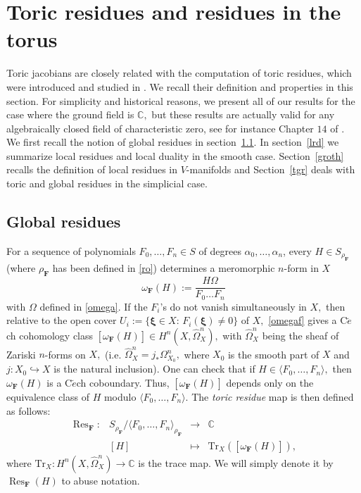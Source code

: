 \documentclass[a4paper,11pt]{amsart}
\newcommand{\Res}{\operatorname{Res}}
\newcommand{\C}{\mathbb{C}}
\newcommand{\bfF}{{\boldsymbol{F}}}
\newcommand{\bfxi}{{\boldsymbol{\xi}}}
\numberwithin{thm}{section}
\numberwithin{equation}{section}
\theoremstyle{definition}
\theoremstyle{plain}
\begin{document}
\bigskip
\section{Toric residues and residues in the torus}\label{sec:3}
Toric jacobians  are closely related with the computation of toric residues, which were introduced and studied in \cite{cox96, CCD97}.  We recall their definition and properties in this section. For simplicity and historical reasons, we present all of our results for the case where the ground field is $\C,$ but these results are actually valid for any algebraically closed field of characteristic zero, see for instance Chapter $14$ of \cite{kun08}. 
We first recall the notion of global residues in section~\ref{ssec:gr}. In section~\ref{lrd} we summarize local residues and local duality in the smooth case. Section~\ref{groth} recalls the definition of local residues in $V$-manifolds and Section~\ref{tgr} deals with toric and global residues in the simplicial case. 

\subsection{Global residues}\label{ssec:gr}
For a sequence of polynomials $F_0,\ldots, F_n\in S$ of degrees $\alpha_0,\ldots, \alpha_n$, every $H\in S_{\rho_\bfF}$ (where $\rho_\bfF$ has been defined in \eqref{ro}) determines a meromorphic $n$-form in $X$
\begin{equation}\label{omegaf}
\omega_\bfF(H):=\frac{H\Omega}{F_0\ldots F_n}
\end{equation}
with $\Omega$ defined in \eqref{omega}. If the $F_i$'s do not vanish simultaneously in $X,$ then relative to the open cover $U_i:=\{\bfxi \in X:\, F_i(\bfxi)\neq0\}$ of $X,$ \eqref{omegaf} gives a C$\breve{e}$ch cohomology class $[\omega_\bfF(H)]\in H^n(X,\widehat{\Omega}^n_X),$ with $\widehat{\Omega}^n_X$ being the sheaf of Zariski $n$-forms on $X,$ (i.e. $\widehat{\Omega}^n_X=j_*\Omega^n_{X_0},$ where $X_0$ is the smooth part of $X$ and $j:X_0\hookrightarrow X$ is the natural inclusion). One can check that  if $H\in\langle F_0,\ldots, F_n\rangle,$ then $\omega_\bfF(H)$ is a C$\breve{e}$ch coboundary. Thus, $[\omega_\bfF(H)]$ depends only on the equivalence class of $H$ modulo $\langle F_0,\ldots, F_n\rangle.$ The {\em toric residue} map is then defined as follows:
\begin{equation}\label{tres}
\begin{array}{cccc}
\Res_\bfF:&S_{\rho_\bfF}/\langle F_0,\ldots, F_n\rangle_{\rho_\bfF}&\to&\C\\
&[H]&\mapsto & \mbox{Tr}_X([\omega_\bfF(H)]),
\end{array}
\end{equation}
where $\mbox{Tr}_X:H^n(X, \widehat{\Omega}^n_X)\to\C$ is the trace map. We will simply denote it by $\Res_\bfF(H)$ to abuse notation.
\end{document}
